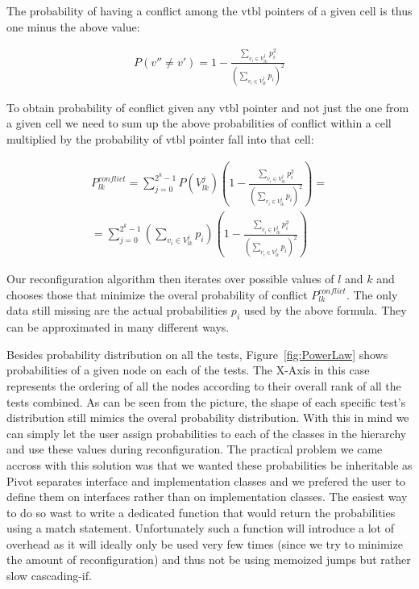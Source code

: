 \documentclass[preprint]{sigplanconf}
\begin{document}
The probability of having a conflict among the vtbl pointers of a given cell is 
thus one minus the above value:

\begin{eqnarray*}
P(v''\neq v')=1-\frac{\sum\limits_{v_i \in V^j_{lk}}p_i^2}{(\sum\limits_{v_{i} \in V^j_{lk}}p_{i})^2}
\end{eqnarray*}

To obtain probability of conflict given any vtbl pointer and not just the one 
from a given cell we need to sum up the above probabilities of conflict within a 
cell multiplied by the probability of vtbl pointer fall into that cell:

\begin{eqnarray*}
P_{lk}^{conflict}=\sum\limits_{j=0}^{2^k-1}P(V^j_{lk})(1-\frac{\sum\limits_{v_i \in V^j_{lk}}p_i^2}{(\sum\limits_{v_{i} \in V^j_{lk}}p_{i})^2})=\\
=\sum\limits_{j=0}^{2^k-1}(\sum\limits_{v_{i} \in V^j_{lk}}p_{i})(1-\frac{\sum\limits_{v_i \in V^j_{lk}}p_i^2}{(\sum\limits_{v_{i} \in V^j_{lk}}p_{i})^2})
\end{eqnarray*}

Our reconfiguration algorithm then iterates over possible values of $l$ and $k$ 
and chooses those that minimize the overal probability of conflict $P_{lk}^{conflict}$.
The only data still missing are the actual probabilities $p_i$ used by the above 
formula. They can be approximated in many different ways.

Besides probability distribution on all the tests, Figure~\ref{fig:PowerLaw} 
shows probabilities of a given node on each of the tests. The X-Axis in this 
case represents the ordering of all the nodes according to their overall rank 
of all the tests combined. As can be seen from the picture, the shape of each 
specific test's distribution still mimics the overal probability distribution. 
With this in mind we can simply let the user assign probabilities to each of the 
classes in the hierarchy and use these values during reconfiguration. The 
practical problem we came accross with this solution was that we wanted these 
probabilities be inheritable as Pivot separates interface and implementation 
classes and we prefered the user to define them on interfaces rather than on 
implementation classes. The easiest way to do so wast to write a dedicated 
function that would return the probabilities using a match statement. 
Unfortunately such a function will introduce a lot of overhead as it will 
ideally only be used very few times (since we try to minimize the amount of 
reconfiguration) and thus not be using memoized jumps but rather slow 
cascading-if.
\end{document}
